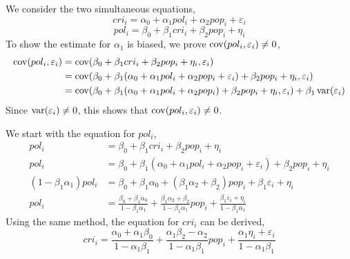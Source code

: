 \documentclass[12pt,twoside]{article}
\begin{document}
\begin{problems}
\begin{problemparts}
\end{problemparts}

\newpage

\problem  %

\begin{problemparts}

\problempart %

We consider the two simultaneous equations, 
$$ cri_i = \alpha_0 + \alpha_1 pol_i + \alpha_2 pop_i +
\varepsilon_i $$
$$ pol_i = \beta_0 + \beta_1 cri_i + \beta_2 pop_i + \eta_i $$
To show the estimate for $\alpha_1$ is biased, we prove $\operatorname{cov}(pol_i,
\varepsilon_i) \neq 0$,
\begin{align*}
    \operatorname{cov}(pol_i, \varepsilon_i) &= \operatorname{cov}(\beta_0 + \beta_1 cri_i + \beta_2
    pop_i + \eta_i, \varepsilon_i) \\
    &= \operatorname{cov}(\beta_0 + \beta_1 (\alpha_0 + \alpha_1 pol_i + \alpha_2
    pop_i + \varepsilon_i) + \beta_2 pop_i + \eta_i,
    \varepsilon_i) \\
    &= \operatorname{cov}(\beta_0 + \beta_1 (\alpha_0 + \alpha_1 pol_i + \alpha_2
    pop_i) + \beta_2 pop_i + \eta_i,
    \varepsilon_i) + \beta_1 \operatorname{var}(\varepsilon_i) 
\end{align*}
Since $\operatorname{var} (\varepsilon_i) \neq 0$, this shows that $\operatorname{cov}(pol_i,
\varepsilon_i) \neq 0$.

\problempart %

We start with the equation for $pol_i$,
\begin{align*}
    pol_i &= \beta_0 + \beta_1 cri_i + \beta_2 pop_i + \eta_i \\
    pol_i &= \beta_0 + \beta_1 (\alpha_0 + \alpha_1 pol_i +
    \alpha_2 pop_i + \varepsilon_i)+ \beta_2 pop_i + \eta_i \\
    (1 - \beta_1 \alpha_1) pol_i &= \beta_0 + \beta_1 \alpha_0 +
    (\beta_1 \alpha_2 + \beta_2) pop_i + \beta_1 \varepsilon_i +
    \eta_i \\
    pol_i &= \frac{\beta_0 + \beta_1 \alpha_0}{1 - \beta_1 \alpha_1}
    + \frac{\beta_1 \alpha_2 + \beta_2}{1 - \beta_1 \alpha_1} pop_i +
    \frac{\beta_1 \varepsilon_i + \eta_i}{1 - \beta_1 \alpha_1}
\end{align*}
Using the same method, the equation for $cri_i$ can be derived,
$$ cri_i = \frac{\alpha_0 + \alpha_1 \beta_0}{1 - \alpha_1 \beta_1} +
\frac{\alpha_1 \beta_2 - \alpha_2}{1 - \alpha_1 \beta_1} pop_i +
\frac{\alpha_1 \eta_i + \varepsilon_i}{1 - \alpha_1 \beta_1} $$

\problempart %


\end{problemparts}
\end{problems}
\end{document}
